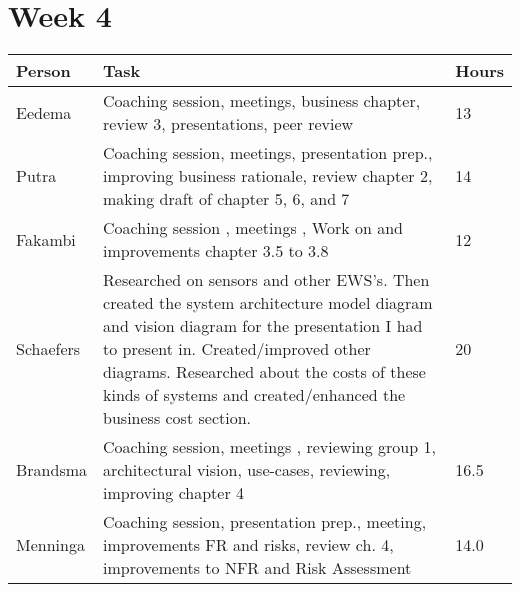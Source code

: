 \section{Week 4}
\begin{tabular}{p{} p{} p{}}
	\textbf{Person} & \textbf{Task}                                                                                                                                                                                                                                                                                & \textbf{Hours} \\ \midrule
	Eedema          & Coaching session, meetings, business chapter, review 3, presentations, peer review                                                                                                                                                                                                           & 13             \\ \midrule
	Putra           & Coaching session, meetings, presentation prep., improving business rationale, review chapter 2, making draft of chapter 5, 6, and 7                                                                                                                                                          & 14             \\ \midrule
	Fakambi         & Coaching session , meetings , Work on and improvements chapter 3.5 to 3.8                                                                                                                                                                                                                    & 12             \\ \midrule
	Schaefers       & Researched on sensors and other EWS's. Then created the system architecture model diagram and vision diagram for the presentation I had to present in. Created/improved other diagrams. Researched about the costs of these kinds of systems and created/enhanced the business cost section. & 20             \\ \midrule
	Brandsma        & Coaching session, meetings , reviewing group 1, architectural vision, use-cases, reviewing, improving chapter 4                                                                                                                                                                              & 16.5           \\ \midrule
	Menninga        & Coaching session, presentation prep., meeting, improvements FR and risks, review ch. 4, improvements to NFR and Risk Assessment                                                                                                                                                              & 14.0           \\ \midrule
\end{tabular}

